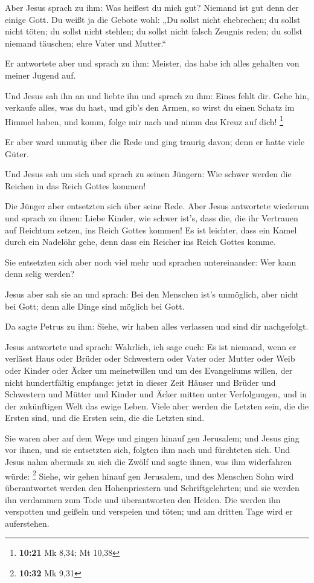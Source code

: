 Aber Jesus sprach zu ihm: Was heißest du mich gut? Niemand
ist gut denn der einige Gott.  Du weißt ja die Gebote wohl:
„Du sollst nicht ehebrechen; du sollst nicht töten; du sollst nicht
stehlen; du sollst nicht falsch Zeugnis reden; du sollst niemand
täuschen; ehre Vater und Mutter.``

 Er antwortete aber und sprach zu ihm: Meister, das habe
ich alles gehalten von meiner Jugend auf.

 Und Jesus sah ihn an und liebte ihn und sprach zu ihm:
Eines fehlt dir. Gehe hin, verkaufe alles, was du hast, und gib's den
Armen, so wirst du einen Schatz im Himmel haben, und komm, folge mir
nach und nimm das Kreuz auf dich! \footnote{\textbf{10:21} Mk 8,34; Mt
  10,38}

 Er aber ward unmutig über die Rede und ging traurig davon;
denn er hatte viele Güter.

 Und Jesus sah um sich und sprach zu seinen Jüngern: Wie
schwer werden die Reichen in das Reich Gottes kommen!

 Die Jünger aber entsetzten sich über seine Rede. Aber
Jesus antwortete wiederum und sprach zu ihnen: Liebe Kinder, wie schwer
ist's, dass die, die ihr Vertrauen auf Reichtum setzen, ins Reich Gottes
kommen!  Es ist leichter, dass ein Kamel durch ein Nadelöhr
gehe, denn dass ein Reicher ins Reich Gottes komme.

 Sie entsetzten sich aber noch viel mehr und sprachen
untereinander: Wer kann denn selig werden?

 Jesus aber sah sie an und sprach: Bei den Menschen ist's
unmöglich, aber nicht bei Gott; denn alle Dinge sind möglich bei Gott.

 Da sagte Petrus zu ihm: Siehe, wir haben alles verlassen
und sind dir nachgefolgt.

 Jesus antwortete und sprach: Wahrlich, ich sage euch: Es
ist niemand, wenn er verlässt Haus oder Brüder oder Schwestern oder
Vater oder Mutter oder Weib oder Kinder oder Äcker um meinetwillen und
um des Evangeliums willen,  der nicht hundertfältig
empfange: jetzt in dieser Zeit Häuser und Brüder und Schwestern und
Mütter und Kinder und Äcker mitten unter Verfolgungen, und in der
zukünftigen Welt das ewige Leben.  Viele aber werden die
Letzten sein, die die Ersten sind, und die Ersten sein, die die Letzten
sind.

 Sie waren aber auf dem Wege und gingen hinauf gen
Jerusalem; und Jesus ging vor ihnen, und sie entsetzten sich, folgten
ihm nach und fürchteten sich. Und Jesus nahm abermals zu sich die Zwölf
und sagte ihnen, was ihm widerfahren würde: \footnote{\textbf{10:32} Mk
  9,31}  Siehe, wir gehen hinauf gen Jerusalem, und des
Menschen Sohn wird überantwortet werden den Hohenpriestern und
Schriftgelehrten; und sie werden ihn verdammen zum Tode und
überantworten den Heiden.  Die werden ihn verspotten und
geißeln und verspeien und töten; und am dritten Tage wird er
auferstehen.

